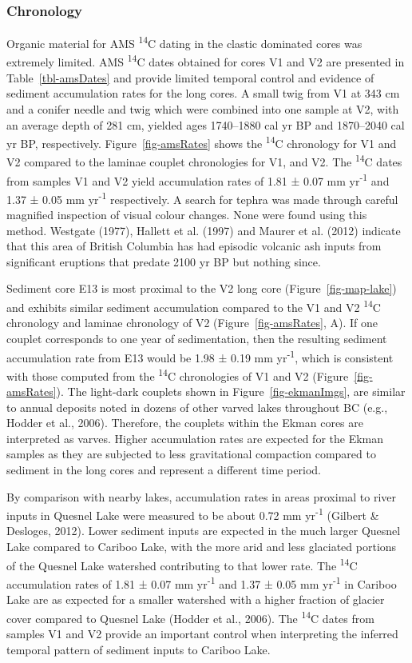 \documentclass[
  letterpaper,
  DIV=11,
  numbers=noendperiod]{scrartcl}
\begin{document}
\subsubsection{Chronology}\label{chronology}

Organic material for AMS \textsuperscript{14}C dating in the clastic
dominated cores was extremely limited. AMS \textsuperscript{14}C dates
obtained for cores V1 and V2 are presented in Table~\ref{tbl-amsDates}
and provide limited temporal control and evidence of sediment
accumulation rates for the long cores. A small twig from V1 at 343 cm
and a conifer needle and twig which were combined into one sample at V2,
with an average depth of 281 cm, yielded ages 1740--1880 cal yr BP and
1870--2040 cal yr BP, respectively. Figure~\ref{fig-amsRates} shows the
\textsuperscript{14}C chronology for V1 and V2 compared to the laminae
couplet chronologies for V1, and V2. The \textsuperscript{14}C dates
from samples V1 and V2 yield accumulation rates of 1.81 ± 0.07 mm
yr\textsuperscript{-1} and 1.37 ± 0.05 mm yr\textsuperscript{-1}
respectively. A search for tephra was made through careful magnified
inspection of visual colour changes. None were found using this method.
Westgate (1977), Hallett et al. (1997) and Maurer et al. (2012) indicate
that this area of British Columbia has had episodic volcanic ash inputs
from significant eruptions that predate 2100 yr BP but nothing since.

Sediment core E13 is most proximal to the V2 long core
(Figure~\ref{fig-map-lake}) and exhibits similar sediment accumulation
compared to the V1 and V2 \textsuperscript{14}C chronology and laminae
chronology of V2 (Figure~\ref{fig-amsRates}, A). If one couplet
corresponds to one year of sedimentation, then the resulting sediment
accumulation rate from E13 would be 1.98 ± 0.19 mm
yr\textsuperscript{-1}, which is consistent with those computed from the
\textsuperscript{14}C chronologies of V1 and V2
(Figure~\ref{fig-amsRates}). The light-dark couplets shown in
Figure~\ref{fig-ekmanImgs}, are similar to annual deposits noted in
dozens of other varved lakes throughout BC (e.g., Hodder et al., 2006).
Therefore, the couplets within the Ekman cores are interpreted as
varves. Higher accumulation rates are expected for the Ekman samples as
they are subjected to less gravitational compaction compared to sediment
in the long cores and represent a different time period.

By comparison with nearby lakes, accumulation rates in areas proximal to
river inputs in Quesnel Lake were measured to be about 0.72 mm
yr\textsuperscript{-1} (Gilbert \& Desloges, 2012). Lower sediment
inputs are expected in the much larger Quesnel Lake compared to Cariboo
Lake, with the more arid and less glaciated portions of the Quesnel Lake
watershed contributing to that lower rate. The \textsuperscript{14}C
accumulation rates of 1.81 ± 0.07 mm yr\textsuperscript{-1} and 1.37 ±
0.05 mm yr\textsuperscript{-1} in Cariboo Lake are as expected for a
smaller watershed with a higher fraction of glacier cover compared to
Quesnel Lake (Hodder et al., 2006). The \textsuperscript{14}C dates from
samples V1 and V2 provide an important control when interpreting the
inferred temporal pattern of sediment inputs to Cariboo Lake.
\end{document}
